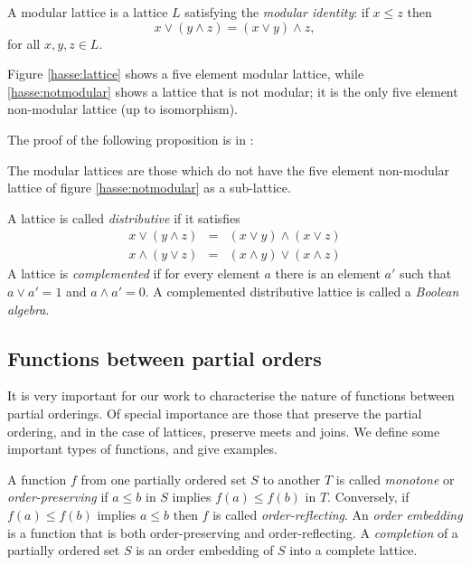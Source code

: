 \documentclass[12pt]{report}
\begin{document}
\begin{defn}[Modularity]
A modular lattice is a lattice $L$ satisfying the \emph{modular identity}: if $x \le z$ then
$$x \lor (y \land z) = (x \lor y) \land z,$$
for all $x,y,z \in L$.
\end{defn}

Figure \ref{hasse:lattice} shows a five element modular lattice, while \ref{hasse:notmodular} shows a lattice that is not modular; it is the only five element non-modular lattice (up to isomorphism).

The proof of the following proposition is in \cite{Birkhoff:48}:
\begin{prop}
The modular lattices are those which do not have the five element non-modular lattice of figure \ref{hasse:notmodular} as a sub-lattice.
\end{prop}

\begin{defn}
A lattice is called \emph{distributive} if it satisfies
\begin{eqnarray*}
x\lor(y\land z) & = & (x\lor y)\land(x\lor z)\\
x\land(y\lor z) & = & (x\land y)\lor(x\land z)
\end{eqnarray*}
A lattice is \emph{complemented} if for every element $a$ there is an element $a'$ such that $a \lor a' = 1$ and $a \land a' = 0$. A complemented distributive lattice is called a \emph{Boolean algebra}.
\end{defn}

\subsection{Functions between partial orders}

It is very important for our work to characterise the nature of functions between partial orderings. Of special importance are those that preserve the partial ordering, and in the case of lattices, preserve meets and joins. We define some important types of functions, and give examples.

\begin{defn}
A function $f$ from one partially ordered set $S$ to another $T$ is called \emph{monotone} or \emph{order-preserving} if $a \le b$ in $S$ implies $f(a) \le f(b)$ in $T$. Conversely, if $f(a) \le f(b)$ implies $a \le b$ then $f$ is called \emph{order-reflecting}. An \emph{order embedding} is a function that is both order-preserving and order-reflecting. A \emph{completion} of a partially ordered set $S$ is an order embedding of $S$ into a complete lattice.
\end{defn}
\end{document}
